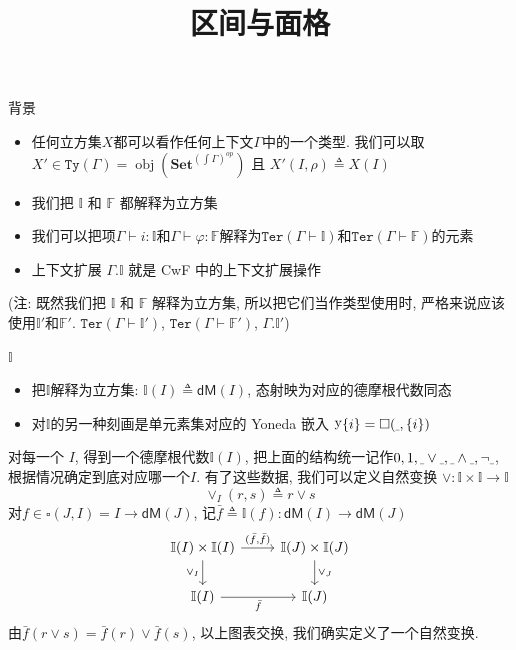 \documentclass[aspectratio=169,xcolor=dvipsnames]{beamer}
\title{区间与面格}
\date{}
\newcommand\bbI{\mathbb{I}}
\newcommand\bbF{\mathbb{F}}
\newcommand\Ty{\mathtt{Ty}}
\newcommand\Ter{\mathtt{Ter}}
\newcommand\dM{\mathsf{dM}}
\newcommand\Set{\mathbf{Set}}
\newcommand{\ul}{{\scalebox{0.4}[1.0]{\_}}}
\DeclareMathOperator\obj{obj}
\DeclareMathOperator\y{y}
\begin{document}
\begin{frame}
    \titlepage
\end{frame}

\begin{frame}{背景}
\begin{itemize}
  \item 任何立方集$X$都可以看作任何上下文$\Gamma$中的一个类型. 我们可以取$X'\in\Ty(\Gamma)=\obj(\Set^{(\int\Gamma)^{op}})$ 且 $X'(I,\rho)\triangleq X(I)$
  \item 我们把 $\bbI$ 和 $\bbF$ 都解释为立方集
  \item 我们可以把项$\Gamma\vdash i:\bbI$和$\Gamma\vdash\varphi:\bbF$解释为$\Ter(\Gamma\vdash\bbI)$和$\Ter(\Gamma\vdash\bbF)$的元素
  \item 上下文扩展 $\Gamma.\bbI$ 就是 CwF 中的上下文扩展操作
\end{itemize}
\vspace*{1\baselineskip}
(注: 既然我们把 $\bbI$ 和 $\bbF$ 解释为立方集, 所以把它们当作类型使用时, 严格来说应该使用$\bbI'$和$\bbF'$. $\Ter(\Gamma\vdash\bbI')$, $\Ter(\Gamma\vdash\bbF')$, $\Gamma.\bbI'$)
\end{frame}

\begin{frame}{$\bbI$}
  \begin{itemize}
    \item 把$\bbI$解释为立方集: $\bbI(I)\triangleq\dM(I)$, 态射映为对应的德摩根代数同态
    \item 对$\bbI$的另一种刻画是单元素集对应的 Yoneda 嵌入 $\y\{i\}=\square(\ul,\{i\})$
  \end{itemize}
  对每一个 $I$, 得到一个德摩根代数$\bbI(I)$, 把上面的结构统一记作$0,1,\ul\lor\ul,\ul\land\ul,\neg\ul$, 根据情况确定到底对应哪一个$I$. 有了这些数据, 我们可以定义自然变换 $\lor:\bbI\times\bbI\to\bbI$\[ \lor_{I}(r,s) \triangleq r \lor s \]
  对$f\in\square(J,I)=I\to\dM(J)$, 记$\bar{f}\triangleq\bbI(f):\dM(I)\to\dM(J)$
  \[
  \begin{tikzcd}
  \bbI(I)\times\bbI(I) \arrow[d,"{\lor_{I}}"'] \arrow[r,"{(\bar{f},\bar{f})}"] & \bbI(J)\times\bbI(J) \arrow[d,"{\lor_{J}}"]\\
  \bbI(I) \arrow[r,"\bar{f}"'] & \bbI(J)
  \end{tikzcd}
  \]
  由$\bar{f}(r\lor s) = \bar{f}(r)\lor\bar{f}(s)$, 以上图表交换, 我们确实定义了一个自然变换.
\end{frame}
\end{document}
